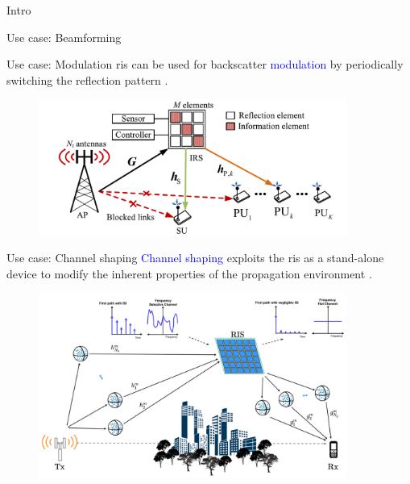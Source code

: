 \documentclass[presentation,xcolor={table},9pt]{beamer}
\begin{document}
\begin{section}{Intro}
\begin{frame}{Use case: Beamforming}
\begin{figure}
{{				}
			}
		\end{figure}
	\end{frame}

	\begin{frame}{Use case: Modulation}
		\gls{ris} can be used for backscatter \textcolor{blue}{modulation} by periodically switching the reflection pattern \cite{Hu2021a}.
		\begin{figure}
			\centering
			\includegraphics[width=0.9\textwidth]{../assets/viva/ris_modulation.pdf}
		\end{figure}
	\end{frame}

	\begin{frame}{Use case: Channel shaping}
		\textcolor{blue}{Channel shaping} exploits the \gls{ris} as a stand-alone device to modify the inherent properties of the propagation environment \cite{Arslan2022}.
		\begin{figure}
			\centering
			\includegraphics[width=0.9\textwidth]{../assets/viva/ris_shaping.pdf}
		\end{figure}
	\end{frame}
\end{section}
\end{document}
